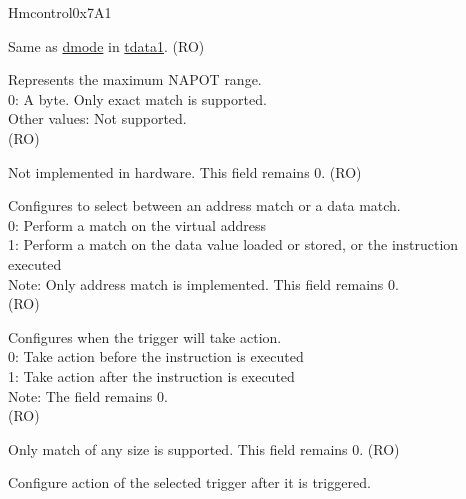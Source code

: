 \begin{register}{H}{mcontrol}{0x7A1}\label{regdesc:LPMCONTROL}
%
%
%
%
%
%
%
%
%
%
%
%
%
%
%
%
%
\regnewline%
\begin{regdesc}\begin{reglist}
\label{fielddesc:LPMCONTROLDMODE}\item [dmode] Same as \hyperref[fielddesc:LPTDATA1DMODE]{dmode} in \hyperref[regdesc:LPTDATA1]{tdata1}. (RO)
\label{fielddesc:LPMCONTROLMASKMAX}\item [maskmax] Represents the maximum NAPOT range. \\
0: A byte. Only exact match is supported.\\
Other values: Not supported.\\
(RO)
\label{fielddesc:LPMCONTROLHIT}\item [hit] Not implemented in hardware. This field remains 0. (RO)
\label{fielddesc:LPMCONTROLSELECT}\item [select] Configures to select between an address match or a data match.\\
0: Perform a match on the virtual address\\
1: Perform a match on the data value loaded or stored, or the instruction executed\\
Note: Only address match is implemented. This field remains 0.\\
(RO)
\label{fielddesc:LPMCONTROLTIMING}\item [timing] Configures when the trigger will take action.\\
0: Take action before the instruction is executed\\
1: Take action after the instruction is executed\\
Note: The field remains 0.\\
(RO)
\label{fielddesc:LPMCONTROLSIZELO}\item [sizelo] Only match of any size is supported. This field remains 0. (RO)
\label{fielddesc:LPMCONTROLACTION}\item [action] Configure action of the selected trigger after it is triggered.\\

\end{reglist}
\end{regdesc}
\end{register}
